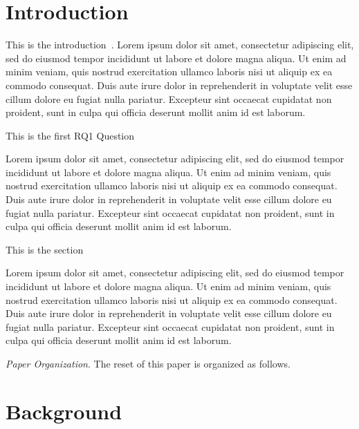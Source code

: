 \documentclass[sigconf,review,anonymous]{acmart}
\begin{document}
\section{Introduction}
\label{sec:introduction}

This is the introduction~\cite{panter2024rustylinuxadvancesrust}.  Lorem ipsum dolor sit amet,
consectetur adipiscing elit, sed do eiusmod tempor incididunt ut labore et dolore magna aliqua. Ut
enim ad minim veniam, quis nostrud exercitation ullamco laboris nisi ut aliquip ex ea commodo
consequat. Duis aute irure dolor in reprehenderit in voluptate velit esse cillum dolore eu fugiat
nulla pariatur. Excepteur sint occaecat cupidatat non proident, sunt in culpa qui officia deserunt
mollit anim id est laborum.


\begin{description}[leftmargin=1cm]
   \item[RQ1] This is the first RQ1 Question

     Lorem ipsum dolor sit amet, consectetur adipiscing elit, sed do eiusmod tempor incididunt ut
     labore et dolore magna aliqua. Ut enim ad minim veniam, quis nostrud exercitation ullamco
     laboris nisi ut aliquip ex ea commodo consequat. Duis aute irure dolor in reprehenderit in
     voluptate velit esse cillum dolore eu fugiat nulla pariatur. Excepteur sint occaecat cupidatat
     non proident, sunt in culpa qui officia deserunt mollit anim id est laborum.

   \item[RQ2] This is the section

     Lorem ipsum dolor sit amet, consectetur adipiscing elit, sed do eiusmod tempor incididunt ut
     labore et dolore magna aliqua. Ut enim ad minim veniam, quis nostrud exercitation ullamco
     laboris nisi ut aliquip ex ea commodo consequat. Duis aute irure dolor in reprehenderit in
     voluptate velit esse cillum dolore eu fugiat nulla pariatur. Excepteur sint occaecat cupidatat
     non proident, sunt in culpa qui officia deserunt mollit anim id est laborum.

 \end{description}

 \textit{Paper Organization}. The reset of this paper is organized as follows.

 \section{Background}
 \label{sec:background}
\end{document}
